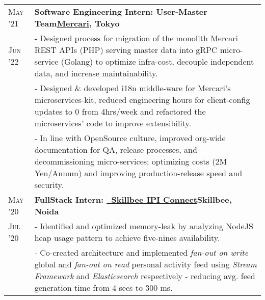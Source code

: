 \documentclass[a4paper,10pt]{extarticle} %
\begin{document}
\begin{tabularx}{\linewidth}{ l | X }


\textsc{May '21} & \textbf{Software Engineering Intern: User-Master Team}\hfill\textbf{\href{https://mercari.com/}{Mercari}, Tokyo}\\
\textsc{Jun '22}& {- Designed process for migration of the monolith Mercari REST APIs (PHP) serving master data into gRPC micro-service (Golang) to optimize infra-cost, decouple independent data, and increase maintainability.}\\
& {- Designed \& developed i18n middle-ware for Mercari's microservices-kit, reduced engineering hours for client-config updates to 0 from 4hrs/week and refactored the microservices' code to improve extensibility.}\\
& {- In line with OpenSource culture, improved org-wide documentation for QA, release processes, and decommissioning micro-services; optimizing costs (2M Yen/Annum) and improving production-release speed and security. }\\[2mm]

\textsc{May '20} & \textbf{FullStack Intern: {\href{https://skillbee.com/}{\ Skillbee IPI Connect}}}\hfill\textbf{Skillbee, Noida}\\
\textsc{Jul '20}& {- Identified and optimized memory-leak by analyzing NodeJS heap usage pattern to achieve five-nines availability.}\\
& {- Co-created architecture and implemented \textit{fan-out on write} global and \textit{fan-out on read} personal activity feed using \textit{Stream Framework} and \textit{Elasticsearch} respectively - reducing avg. feed generation time from 4 secs to 300 ms.}\\[2mm]


\end{tabularx}
\end{document}
